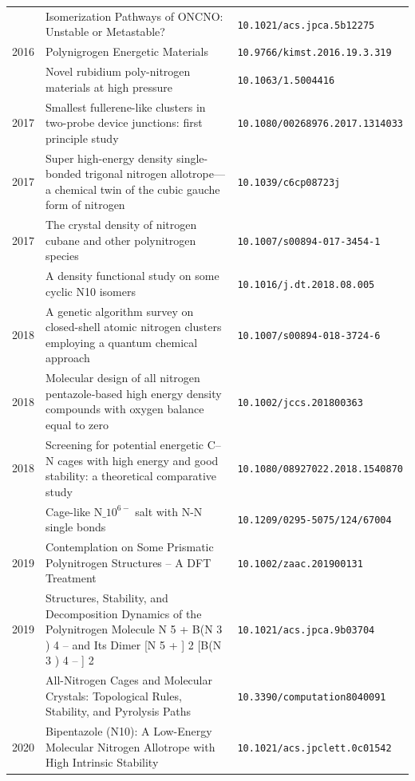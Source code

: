 \begin{longtable}{@{}p{1.0cm}p{10.5cm}p{3.5cm}@{}}
\addlinespace
2016 & Isomerization Pathways of ONCNO: Unstable or Metastable? & \small\texttt{10.1021/acs.jpca.5b12275} \\
2016 & Polynigrogen Energetic Materials & \small\texttt{10.9766/kimst.2016.19.3.319} \\
\addlinespace
2017 & Novel rubidium poly-nitrogen materials at high pressure & \small\texttt{10.1063/1.5004416} \\
2017 & Smallest fullerene-like clusters in two-probe device junctions: first principle study & \small\texttt{10.1080/00268976.2017.1314033} \\
2017 & Super high-energy density single-bonded trigonal nitrogen allotrope—a chemical twin of the cubic gauche form of nitrogen & \small\texttt{10.1039/c6cp08723j} \\
2017 & The crystal density of nitrogen cubane and other polynitrogen species & \small\texttt{10.1007/s00894-017-3454-1} \\
\addlinespace
2018 & A density functional study on some cyclic N10 isomers & \small\texttt{10.1016/j.dt.2018.08.005} \\
2018 & A genetic algorithm survey on closed-shell atomic nitrogen clusters employing a quantum chemical approach & \small\texttt{10.1007/s00894-018-3724-6} \\
2018 & Molecular design of all nitrogen pentazole‐based high energy density compounds with oxygen balance equal to zero & \small\texttt{10.1002/jccs.201800363} \\
2018 & Screening for potential energetic C–N cages with high energy and good stability: a theoretical comparative study & \small\texttt{10.1080/08927022.2018.1540870} \\
\addlinespace
2019 & Cage-like $\text{N}\_{10}^{6-}$ salt with N-N single bonds & \small\texttt{10.1209/0295-5075/124/67004} \\
2019 & Contemplation on Some Prismatic Polynitrogen Structures – A DFT Treatment & \small\texttt{10.1002/zaac.201900131} \\
2019 & Structures, Stability, and Decomposition Dynamics of the Polynitrogen Molecule N 5 + B(N 3 ) 4 – and Its Dimer [N 5 + ] 2 [B(N 3 ) 4 – ] 2 & \small\texttt{10.1021/acs.jpca.9b03704} \\
\addlinespace
2020 & All-Nitrogen Cages and Molecular Crystals: Topological Rules, Stability, and Pyrolysis Paths & \small\texttt{10.3390/computation8040091} \\
2020 & Bipentazole (N10): A Low-Energy Molecular Nitrogen Allotrope with High Intrinsic Stability & \small\texttt{10.1021/acs.jpclett.0c01542} \\

\end{longtable}
